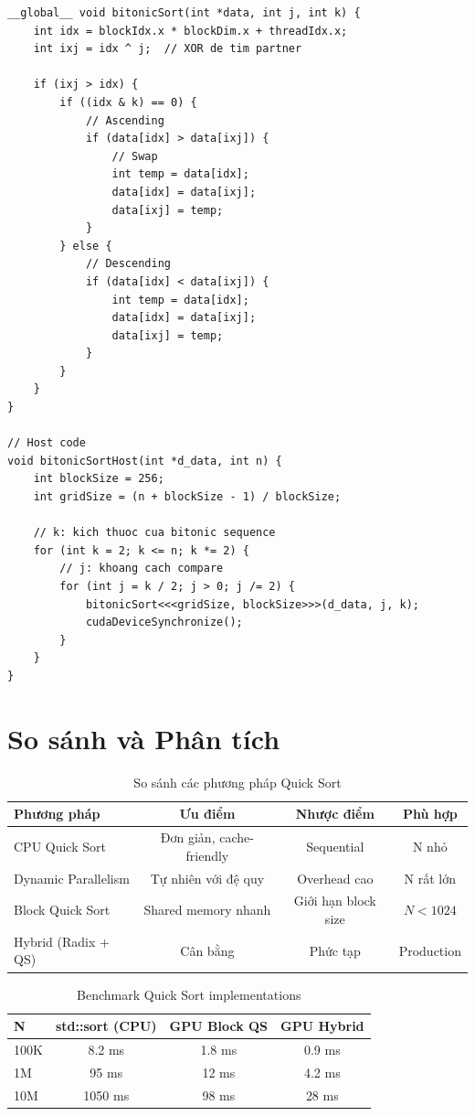 \begin{lstlisting}[caption={Bitonic Sort Kernel}, label={lst:bitonic_sort}]
__global__ void bitonicSort(int *data, int j, int k) {
    int idx = blockIdx.x * blockDim.x + threadIdx.x;
    int ixj = idx ^ j;  // XOR de tim partner
    
    if (ixj > idx) {
        if ((idx & k) == 0) {
            // Ascending
            if (data[idx] > data[ixj]) {
                // Swap
                int temp = data[idx];
                data[idx] = data[ixj];
                data[ixj] = temp;
            }
        } else {
            // Descending
            if (data[idx] < data[ixj]) {
                int temp = data[idx];
                data[idx] = data[ixj];
                data[ixj] = temp;
            }
        }
    }
}

// Host code
void bitonicSortHost(int *d_data, int n) {
    int blockSize = 256;
    int gridSize = (n + blockSize - 1) / blockSize;
    
    // k: kich thuoc cua bitonic sequence
    for (int k = 2; k <= n; k *= 2) {
        // j: khoang cach compare
        for (int j = k / 2; j > 0; j /= 2) {
            bitonicSort<<<gridSize, blockSize>>>(d_data, j, k);
            cudaDeviceSynchronize();
        }
    }
}
\end{lstlisting}

\section{So sánh và Phân tích}

\begin{table}[H]
\centering
\caption{So sánh các phương pháp Quick Sort}
\label{tab:quicksort_comparison}
\begin{tabular}{@{}lccc@{}}
\toprule
\textbf{Phương pháp} & \textbf{Ưu điểm} & \textbf{Nhược điểm} & \textbf{Phù hợp} \\
\midrule
CPU Quick Sort & Đơn giản, cache-friendly & Sequential & N nhỏ \\
Dynamic Parallelism & Tự nhiên với đệ quy & Overhead cao & N rất lớn \\
Block Quick Sort & Shared memory nhanh & Giới hạn block size & $N < 1024$ \\
Hybrid (Radix + QS) & Cân bằng & Phức tạp & Production \\
\bottomrule
\end{tabular}
\end{table}

\begin{table}[H]
\centering
\caption{Benchmark Quick Sort implementations}
\label{tab:quicksort_benchmark}
\begin{tabular}{@{}lccc@{}}
\toprule
\textbf{N} & \textbf{std::sort (CPU)} & \textbf{GPU Block QS} & \textbf{GPU Hybrid} \\
\midrule
100K & 8.2 ms & 1.8 ms & 0.9 ms \\
1M & 95 ms & 12 ms & 4.2 ms \\
10M & 1050 ms & 98 ms & 28 ms \\
\bottomrule
\end{tabular}
\end{table}

